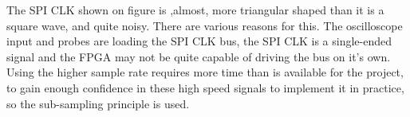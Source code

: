 The SPI CLK shown on figure  is ,almost, more triangular shaped than it is a square wave, and quite noisy. There are various reasons for this. The oscilloscope input and probes are loading the SPI CLK bus, the SPI CLK is a single-ended signal and the FPGA may not be quite capable of driving the bus on it's own. Using the higher sample rate requires more time than is available for the project, to gain enough confidence in these high speed signals to implement it in practice, so the sub-sampling principle is used.